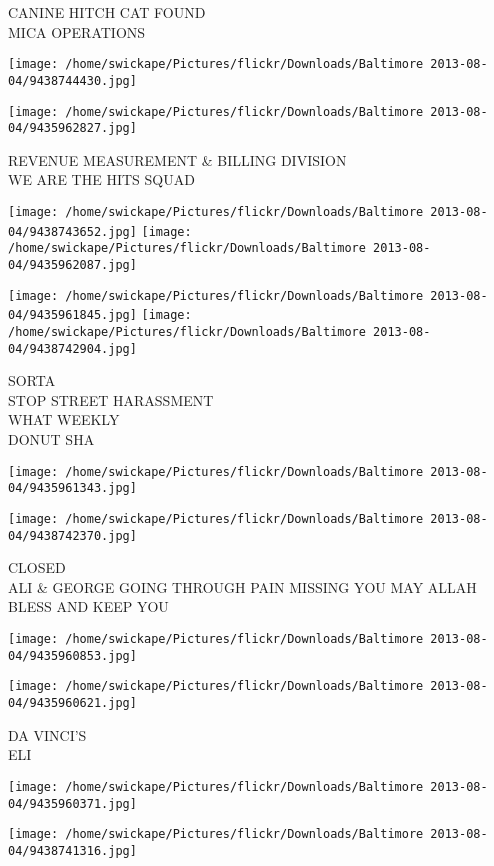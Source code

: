 \documentclass[10pt,letterpaper]{article}
\begin{document}
CANINE HITCH CAT FOUND\\
MICA OPERATIONS
\pagebreak

\texttt{[image: /home/swickape/Pictures/flickr/Downloads/Baltimore 2013-08-04/9438744430.jpg]}

\vspace{0.25in}
\texttt{[image: /home/swickape/Pictures/flickr/Downloads/Baltimore 2013-08-04/9435962827.jpg]}

REVENUE MEASUREMENT \& BILLING DIVISION\\
WE ARE THE HITS SQUAD
\pagebreak

\texttt{[image: /home/swickape/Pictures/flickr/Downloads/Baltimore 2013-08-04/9438743652.jpg]}
\texttt{[image: /home/swickape/Pictures/flickr/Downloads/Baltimore 2013-08-04/9435962087.jpg]}

\texttt{[image: /home/swickape/Pictures/flickr/Downloads/Baltimore 2013-08-04/9435961845.jpg]}
\texttt{[image: /home/swickape/Pictures/flickr/Downloads/Baltimore 2013-08-04/9438742904.jpg]}

SORTA\\
STOP STREET HARASSMENT\\
WHAT WEEKLY\\
DONUT SHA
\pagebreak

\texttt{[image: /home/swickape/Pictures/flickr/Downloads/Baltimore 2013-08-04/9435961343.jpg]}

\vspace{0.25in}
\texttt{[image: /home/swickape/Pictures/flickr/Downloads/Baltimore 2013-08-04/9438742370.jpg]}

CLOSED\\
ALI \& GEORGE GOING THROUGH PAIN MISSING YOU MAY ALLAH BLESS AND KEEP YOU
\pagebreak

\texttt{[image: /home/swickape/Pictures/flickr/Downloads/Baltimore 2013-08-04/9435960853.jpg]}

\vspace{0.25in}
\texttt{[image: /home/swickape/Pictures/flickr/Downloads/Baltimore 2013-08-04/9435960621.jpg]}

DA VINCI'S\\
ELI
\pagebreak

\texttt{[image: /home/swickape/Pictures/flickr/Downloads/Baltimore 2013-08-04/9435960371.jpg]}

\vspace{0.25in}
\texttt{[image: /home/swickape/Pictures/flickr/Downloads/Baltimore 2013-08-04/9438741316.jpg]}
\end{document}
